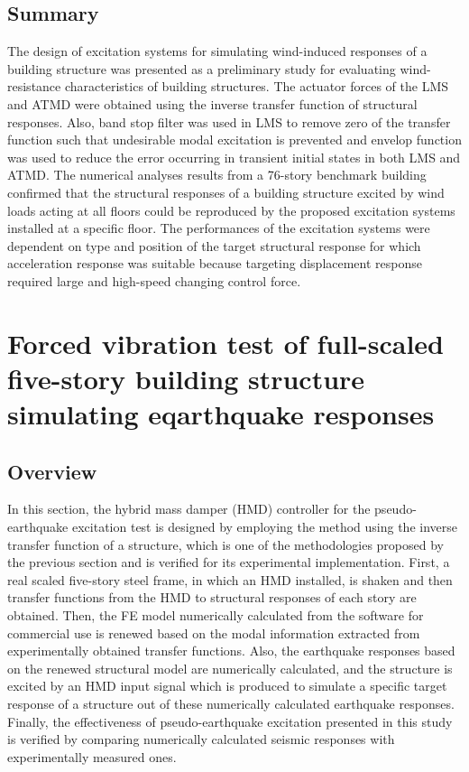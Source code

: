 \subsection{Summary}
The design of excitation systems for simulating wind-induced responses of a building structure was presented as a preliminary study for evaluating wind-resistance characteristics of building structures. The actuator forces of the LMS and ATMD were obtained using the inverse transfer function of structural responses. Also, band stop filter was used in LMS to remove zero of the transfer function such that undesirable modal excitation is prevented and envelop function was used to reduce the error occurring in transient initial states in both LMS and ATMD. The numerical analyses results from a 76-story benchmark building confirmed that the structural responses of a building structure excited by wind loads acting at all floors could be reproduced by the proposed excitation systems installed at a specific floor. The performances of the excitation systems were dependent on type and position of the target structural response for which acceleration response was suitable because targeting displacement response required large and high-speed changing control force.






\section{Forced vibration test of full-scaled five-story building structure simulating eqarthquake responses}
\label{chap:7}
\subsection{Overview}


In this section, the hybrid mass damper (HMD) controller for the pseudo-earthquake excitation test is designed by employing the method using the inverse transfer function of a structure, which is one of the methodologies proposed by the previous section and is verified for its experimental implementation. First, a real scaled five-story steel frame, in which an HMD installed, is shaken and then transfer functions from the HMD to structural responses of each story are obtained. Then, the FE model numerically calculated from the software for commercial use is renewed based on the modal information extracted from experimentally obtained transfer functions. Also, the earthquake responses based on the renewed structural model are numerically calculated, and the structure is excited by an HMD input signal which is produced to simulate a specific target response of a structure out of these numerically calculated earthquake responses. Finally, the effectiveness of pseudo-earthquake excitation presented in this study is verified by comparing numerically calculated seismic responses with experimentally measured ones.

